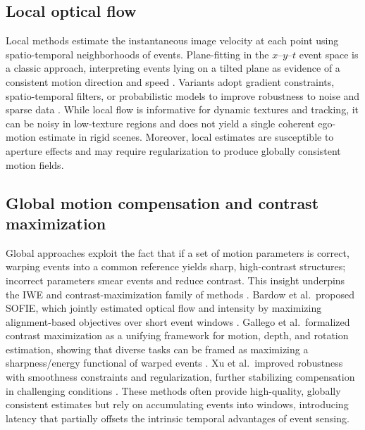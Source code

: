 \subsection{Local optical flow}
Local methods estimate the instantaneous image velocity at each point using spatio-temporal neighborhoods of events. Plane-fitting in the $x$–$y$–$t$ event space is a classic approach, interpreting events lying on a tilted plane as evidence of a consistent motion direction and speed \cite{Benosman2014Epipolar}. Variants adopt gradient constraints, spatio-temporal filters, or probabilistic models to improve robustness to noise and sparse data \cite{Gallego2020Survey}. While local flow is informative for dynamic textures and tracking, it can be noisy in low-texture regions and does not yield a single coherent ego-motion estimate in rigid scenes. Moreover, local estimates are susceptible to aperture effects and may require regularization to produce globally consistent motion fields.

\subsection{Global motion compensation and contrast maximization}
Global approaches exploit the fact that if a set of motion parameters is correct, warping events into a common reference yields sharp, high-contrast structures; incorrect parameters smear events and reduce contrast. This insight underpins the IWE and contrast-maximization family of methods \cite{Gallego2018CMax}. Bardow et al.\ proposed SOFIE, which jointly estimated optical flow and intensity by maximizing alignment-based objectives over short event windows \cite{Bardow2016SOFIE}. Gallego et al.\ formalized contrast maximization as a unifying framework for motion, depth, and rotation estimation, showing that diverse tasks can be framed as maximizing a sharpness/energy functional of warped events \cite{Gallego2018CMax}. Xu et al.\ improved robustness with smoothness constraints and regularization, further stabilizing compensation in challenging conditions \cite{Xu2020TCI}. These methods often provide high-quality, globally consistent estimates but rely on accumulating events into windows, introducing latency that partially offsets the intrinsic temporal advantages of event sensing.

